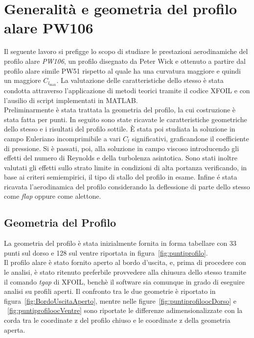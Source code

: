 \chapter{Generalità e geometria del profilo alare PW106}

Il seguente lavoro si prefigge lo scopo di studiare le prestazioni aerodinamiche del profilo alare \emph{PW106}, un profilo disegnato da Peter Wick e ottenuto a partire dal profilo alare simile PW51 rispetto al quale ha una curvatura maggiore e quindi un maggiore $C_{l_\mathrm{max}}$. 
La valutazione delle caratteristiche dello stesso è stata condotta attraverso l'applicazione di metodi teorici tramite il codice XFOIL e con l'ausilio di script implementati in MATLAB.\\
Preliminarmente è stata trattata la geometria del profilo, la cui costruzione è stata fatta per punti. In seguito sono state ricavate le caratteristiche geometriche dello stesso e i risultati del profilo sottile. È stata poi studiata la soluzione in campo Euleriano incomprimibile a vari $C_l$ significativi, graficandone il coefficiente di pressione. Si è passati, poi, alla soluzione in campo viscoso introducendo gli effetti del numero di Reynolds e della turbolenza asintotica. Sono stati inoltre valutati gli effetti sullo strato limite in condizioni di alta portanza verificando, in base ai criteri semiempirici, il tipo di stallo del profilo in esame. Infine é stata ricavata l'aerodinamica del profilo considerando la deflessione di parte dello stesso come {\itshape flap} oppure come alettone.

\section{Geometria del Profilo}

La geometria del profilo è stata inizialmente fornita in forma tabellare con 33 punti sul dorso e 128 sul ventre \cite{prof:sito} riportata in figura~\ref{fig:puntiprofilo}. \\
Il profilo alare è stato fornito aperto al bordo d'uscita, e, prima di procedere con le analisi, è stato ritenuto preferbile provvedere alla chiusura dello stesso tramite il comando {\itshape tgap} di XFOIL, benchè il software sia comunque in grado di eseguire analisi su profili aperti. Il confronto tra le due geometrie è riportato in figura~\vref{fig:BordoUscitaAperto}, mentre nelle figure~\vref{fig:puntiprofiloocDorso} e ~\vref {fig:puntiprofiloocVentre} sono riportate le differenze adimensionalizzate con la corda tra le coordinate z del profilo chiuso e le coordinate z della geometria aperta. 


